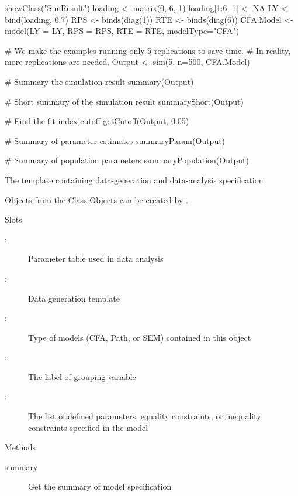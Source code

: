 \documentclass[a4paper]{book}
\begin{document}
%
\begin{Examples}
\begin{ExampleCode}
showClass("SimResult")
loading <- matrix(0, 6, 1)
loading[1:6, 1] <- NA
LY <- bind(loading, 0.7)
RPS <- binds(diag(1))
RTE <- binds(diag(6))
CFA.Model <- model(LY = LY, RPS = RPS, RTE = RTE, modelType="CFA")

# We make the examples running only 5 replications to save time.
# In reality, more replications are needed.
Output <- sim(5, n=500, CFA.Model)

# Summary the simulation result
summary(Output)

# Short summary of the simulation result
summaryShort(Output)

# Find the fit index cutoff
getCutoff(Output, 0.05)

# Summary of parameter estimates
summaryParam(Output)

# Summary of population parameters
summaryPopulation(Output)
\end{ExampleCode}
\end{Examples}
%
\begin{Description}\relax
The template containing data-generation and data-analysis specification
\end{Description}
%
\begin{Section}{Objects from the Class}
Objects can be created by . 
\end{Section}
%
\begin{Section}{Slots}
\begin{description}

\item[:]  Parameter table used in data analysis 
\item[:]  Data generation template 
\item[:]  Type of models (CFA, Path, or SEM) contained in this object 
\item[:]  The label of grouping variable 
\item[:]  The list of defined parameters, equality constraints, or inequality constraints specified in the model 

\end{description}

\end{Section}
%
\begin{Section}{Methods}
\begin{description}

\item[summary] Get the summary of model specification 

\end{description}

\end{Section}
\end{document}
